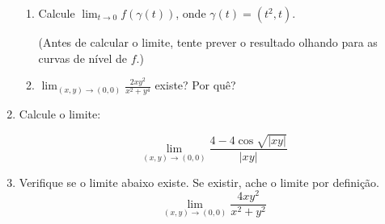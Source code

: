 \documentclass[11pt,a4paper]{article}
\newcommand{\limite}{\displaystyle\lim}
\begin{document}
\begin{enumerate}
\begin{enumerate}
		\item Calcule $\limite_{t \to 0} f(\gamma (t))$, onde $\gamma (t) = (t^2,t)$.
		
		(Antes de calcular o limite, tente prever o resultado olhando para as curvas de nível de $f$.)
		
		\item $\limite_{(x,y) \to (0,0)} \displaystyle\frac{2xy^2}{x^2 + y^4}$ existe? Por quê?
		
	\end{enumerate}
	
		\item Calcule o limite:
		
		$$\limite_{(x,y) \to (0,0)} \displaystyle\frac{4 - 4\cos \sqrt{|xy|}}{|xy|}$$
		
		\item Verifique se o limite abaixo existe. Se existir, ache o limite por definição.
		$$\limite_{(x,y) \to (0,0)} \displaystyle\frac{4xy^2}{x^2 + y^2}$$
		
		
	
	\end{enumerate}
	
\end{document}
